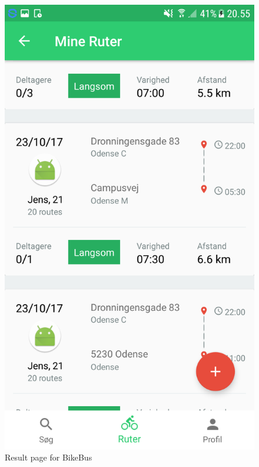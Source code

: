 \begin{figure}[!htb]
\centering
\begin{minipage}{0.32\textwidth}
\centering
    \includegraphics[width=\linewidth]{Graphics/Images/bikebus_search.png}
    \caption{Result page for BikeBus}
    \label{fig:sample_figure}
\end{minipage}\hfill
\begin{minipage}{0.32\textwidth}
\centering

\end{minipage}
\end{figure}
